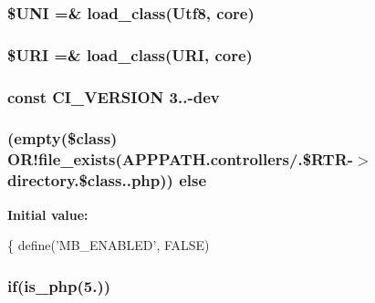 \subsubsection[{\$\+U\+N\+I}]{\setlength{\rightskip}{0pt plus 5cm}\$U\+N\+I =\& load\+\_\+class(\textquotesingle{}Utf8\textquotesingle{}, \textquotesingle{}core\textquotesingle{})}\label{_admin_2system_2core_2_code_igniter_8php_a2060dabd8d00b5b0539bd041bf450924}
\hypertarget{_admin_2system_2core_2_code_igniter_8php_a630d83d898b39ad4568906284f7f5336}{}
\subsubsection[{\$\+U\+R\+I}]{\setlength{\rightskip}{0pt plus 5cm}\$U\+R\+I =\& load\+\_\+class(\textquotesingle{}U\+R\+I\textquotesingle{}, \textquotesingle{}core\textquotesingle{})}\label{_admin_2system_2core_2_code_igniter_8php_a630d83d898b39ad4568906284f7f5336}
\hypertarget{_admin_2system_2core_2_code_igniter_8php_a32e3c3927ba8ec93df92327dfd85d564}{}
\subsubsection[{C\+I\+\_\+\+V\+E\+R\+S\+I\+O\+N}]{\setlength{\rightskip}{0pt plus 5cm}const C\+I\+\_\+\+V\+E\+R\+S\+I\+O\+N \textquotesingle{}3..-\/dev\textquotesingle{}}\label{_admin_2system_2core_2_code_igniter_8php_a32e3c3927ba8ec93df92327dfd85d564}
\hypertarget{_admin_2system_2core_2_code_igniter_8php_ac5109000d551293e102a2bc06f29cda4}{}
\subsubsection[{else}]{ (empty(\$class) O\+R!file\+\_\+exists(A\+P\+P\+P\+A\+T\+H.\textquotesingle{}controllers/\textquotesingle{}.\$R\+T\+R-\/$>$directory.\$class.\textquotesingle{}.php\textquotesingle{})) else}\label{_admin_2system_2core_2_code_igniter_8php_ac5109000d551293e102a2bc06f29cda4}
{\bfseries Initial value\+:}
\begin{DoxyCode}
\{
        define(\textcolor{stringliteral}{'MB\_ENABLED'}, FALSE)
\end{DoxyCode}
\hypertarget{_admin_2system_2core_2_code_igniter_8php_a6503a8f8da73cafe64ad07639c198f54}{}
\subsubsection[{if}]{\setlength{\rightskip}{0pt plus 5cm}if({\bf is\+\_\+php}(\textquotesingle{}5.\textquotesingle{}))}\label{_admin_2system_2core_2_code_igniter_8php_a6503a8f8da73cafe64ad07639c198f54}
